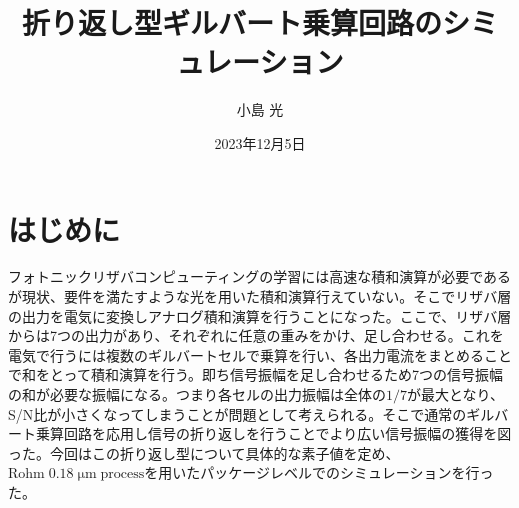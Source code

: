 \documentclass[twocolumn]{jsarticle}
\begin{document}
\title{折り返し型ギルバート乗算回路のシミュレーション}
\author{小島 光}
\date{2023年12月5日}
\maketitle


\section{はじめに}
    フォトニックリザバコンピューティングの学習には高速な積和演算が必要であるが現状、要件を満たすような光を用いた積和演算行えていない。そこでリザバ層の出力を電気に変換しアナログ積和演算を行うことになった。ここで、リザバ層からは7つの出力があり、それぞれに任意の重みをかけ、足し合わせる。これを電気で行うには複数のギルバートセルで乗算を行い、各出力電流をまとめることで和をとって積和演算を行う。即ち信号振幅を足し合わせるため7つの信号振幅の和が必要な振幅になる。つまり各セルの出力振幅は全体の$1/7$が最大となり、S/N比が小さくなってしまうことが問題として考えられる。そこで通常のギルバート乗算回路を応用し信号の折り返しを行うことでより広い信号振幅の獲得を図った。今回はこの折り返し型について具体的な素子値を定め、$\mathrm{Rohm\;0.18\;\mu m\;process}$を用いたパッケージレベルでのシミュレーションを行った。
\end{document}
